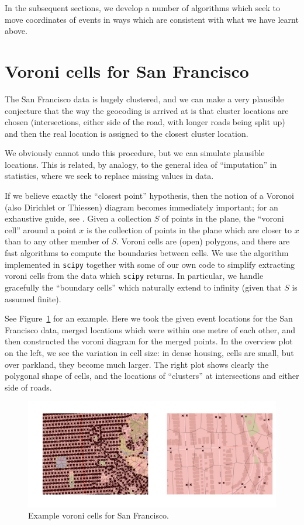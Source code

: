 \documentclass[twoside,a4paper,twocolumn,10pt]{article}
\theoremstyle{plain}
\theoremstyle{definition}
\begin{document}
In the subsequent sections, we develop a number of algorithms which seek to
move coordinates of events in ways which are consistent with what we have learnt above.



\section{Voroni cells for San Francisco}

The San Francisco data is hugely clustered, and we can make a very plausible conjecture
that the way the geocoding is arrived at is that cluster locations are chosen (intersections,
either side of the road, with longer roads being split up) and then the real location
is assigned to the closest cluster location.

We obviously cannot undo this procedure, but we can simulate plausible locations.
This is related, by analogy, to the general idea of ``imputation'' in statistics, where we
seek to replace missing values in data.

If we believe exactly the ``closest point'' hypothesis, then the notion of a Voronoi
(also Dirichlet or Thiessen) diagram becomes immediately important;
for an exhaustive guide, see \cite{obs}.
Given a collection $S$
of points in the plane, the ``voroni cell'' around a point $x$ is the collection of points
in the plane which are closer to $x$ than to any other member of $S$.  Voroni cells are (open)
polygons, and there are fast algorithms to compute the boundaries between cells.  We use
the algorithm implemented in \texttt{scipy} together with some of our own code to simplify
extracting voroni cells from the data which \texttt{scipy} returns.  In particular, we handle
gracefully the ``boundary cells'' which naturally extend to infinity (given that $S$ is assumed
finite).

See Figure~\ref{fig:sf_vor_1} for an example.  Here we took the given event locations for the
San Francisco data, merged locations which were within one metre of each other, and then
constructed the voroni diagram for the merged points.  In the overview plot on the left,
we see the variation in cell size: in dense housing, cells are small, but over parkland, they
become much larger.  The right plot shows clearly the polygonal shape of cells, and the locations
of ``clusters'' at intersections and either side of roads.

\begin{figure}
  \includegraphics[width=\textwidth]{sf_vor_1.png}
  \caption{Example voroni cells for San Francisco.}
  \label{fig:sf_vor_1}
\end{figure}
\end{document}
